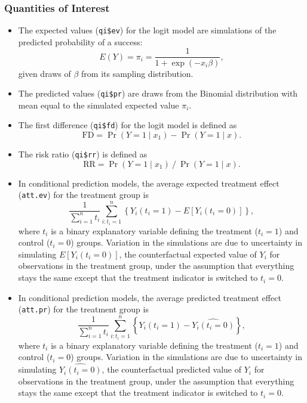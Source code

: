 \documentclass{article}
\begin{document}
\subsubsection{Quantities of Interest}
\begin{itemize}
\item The expected values ({\tt qi\$ev}) for the logit model are
  simulations of the predicted probability of a success: $$E(Y) =
  \pi_i= \frac{1}{1 + \exp(-x_i \beta)},$$ given draws of $\beta$ from
  its sampling distribution.

\item The predicted values ({\tt qi\$pr}) are draws from the Binomial
  distribution with mean equal to the simulated expected value $\pi_i$.  

\item The first difference ({\tt qi\$fd}) for the logit model is defined as
\begin{equation*}
\textrm{FD} = \Pr(Y = 1 \mid x_1) - \Pr(Y = 1 \mid x).
\end{equation*}

\item The risk ratio ({\tt qi\$rr}) is defined as
\begin{equation*}
\textrm{RR} = \Pr(Y = 1 \mid x_1) \ / \ \Pr(Y = 1 \mid x).
\end{equation*}

\item In conditional prediction models, the average expected treatment
  effect ({\tt att.ev}) for the treatment group is 
    \begin{equation*} \frac{1}{\sum_{i=1}^n t_i}\sum_{i:t_i=1}^n \left\{ Y_i(t_i=1) -
      E[Y_i(t_i=0)] \right\},
    \end{equation*} 
    where $t_i$ is a binary explanatory variable defining the treatment
    ($t_i=1$) and control ($t_i=0$) groups.  Variation in the
    simulations are due to uncertainty in simulating $E[Y_i(t_i=0)]$,
    the counterfactual expected value of $Y_i$ for observations in the
    treatment group, under the assumption that everything stays the
    same except that the treatment indicator is switched to $t_i=0$.

\item In conditional prediction models, the average predicted treatment
  effect ({\tt att.pr}) for the treatment group is 
    \begin{equation*} \frac{1}{\sum_{i=1}^n t_i}\sum_{i:t_i=1}^n \left\{ Y_i(t_i=1) -
      \widehat{Y_i(t_i=0)}\right\},
    \end{equation*} 
    where $t_i$ is a binary explanatory variable defining the
    treatment ($t_i=1$) and control ($t_i=0$) groups.  Variation in
    the simulations are due to uncertainty in simulating
    $\widehat{Y_i(t_i=0)}$, the counterfactual predicted value of
    $Y_i$ for observations in the treatment group, under the
    assumption that everything stays the same except that the
    treatment indicator is switched to $t_i=0$.
\end{itemize}
\end{document}
